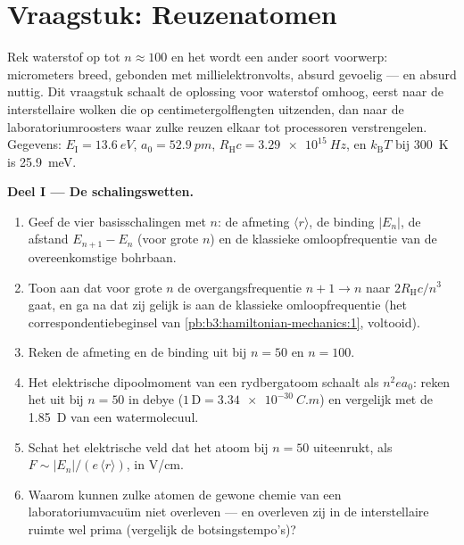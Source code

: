 \section{Vraagstuk: Reuzenatomen}

\begin{problem}\label{pb:b3:hydrogen-atom:1}
Rek waterstof op tot $n \approx 100$ en het wordt een ander soort
voorwerp: micrometers breed, gebonden met millielektronvolts, absurd
gevoelig --- en absurd nuttig. Dit vraagstuk schaalt de oplossing voor
waterstof omhoog, eerst naar de interstellaire wolken die op
centimetergolflengten uitzenden, dan naar de laboratoriumroosters waar
zulke reuzen elkaar tot processoren verstrengelen. Gegevens:
$E_{\text{I}} = \qty{13.6}{eV}$, $a_0 = \qty{52.9}{pm}$,
$R_{\text{H}}c = \qty{3.29e15}{Hz}$, en $k_{\text{B}}T$ bij
\qty{300}{K} is \qty{25.9}{meV}.

\medskip\noindent\textbf{Deel I --- De schalingswetten.}
\begin{enumerate}
  \item Geef de vier basisschalingen met $n$: de afmeting $\langle
        r\rangle$, de binding $|E_n|$, de afstand $E_{n+1} - E_n$ (voor
        grote $n$) en de klassieke omloopfrequentie van de
        overeenkomstige bohrbaan.
  \item Toon aan dat voor grote $n$ de overgangsfrequentie $n+1 \to
        n$ naar $2R_{\text{H}}c/n^3$ gaat, en ga na dat zij gelijk is aan de
        klassieke omloopfrequentie (het correspondentiebeginsel van
        \cref{pb:b3:hamiltonian-mechanics:1}, voltooid).
  \item Reken de afmeting en de binding uit bij $n = 50$ en $n = 100$.
  \item Het elektrische dipoolmoment van een rydbergatoom schaalt als
        $n^2ea_0$: reken het uit bij $n = 50$ in debye ($1\,\text{D} =
        \qty{3.34e-30}{C.m}$) en vergelijk met de \qty{1.85}{D} van een
        watermolecuul.
  \item Schat het elektrische veld dat het atoom bij $n = 50$ uiteenrukt,
        als $F \sim |E_n|/(e\,\langle r\rangle)$, in V/cm.
  \item Waarom kunnen zulke atomen de gewone chemie van een
        laboratoriumvacuüm niet overleven --- en overleven zij in de
        interstellaire ruimte wel prima (vergelijk de botsingstempo's)?
\end{enumerate}


\end{problem}
